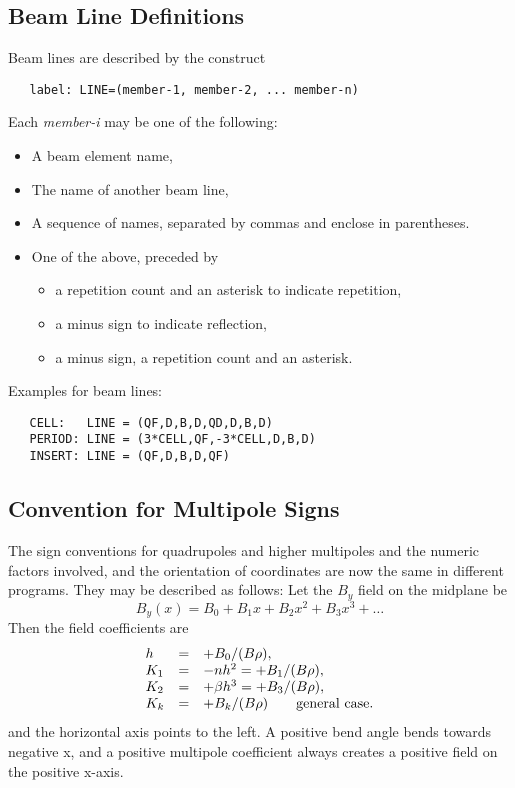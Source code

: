 \documentclass{article}
\begin{document}
\subsection{Beam Line Definitions}
Beam lines are described by the construct
\begin{verbatim}
   label: LINE=(member-1, member-2, ... member-n)
\end{verbatim}
Each {\em member-i} may be one of the following:
\begin{itemize}
\item
  A beam element name,
\item
  The name of another beam line,
\item
  A sequence of names, separated by commas and enclose in parentheses.
\item
  One of the above, preceded by
  \begin{itemize}
  \item
    a repetition count and an asterisk to indicate repetition,
  \item
    a minus sign to indicate reflection,
  \item
    a minus sign, a repetition count and an asterisk.
  \end{itemize}
\end{itemize}
Examples for beam lines:
\begin{verbatim}
   CELL:   LINE = (QF,D,B,D,QD,D,B,D)
   PERIOD: LINE = (3*CELL,QF,-3*CELL,D,B,D)
   INSERT: LINE = (QF,D,B,D,QF)
\end{verbatim}

\subsection{Convention for Multipole Signs}
The sign conventions for quadrupoles and higher multipoles and the
numeric factors involved, and the orientation of coordinates are now
the same in different programs.
They may be described as follows:
Let the $B_y$ field on the midplane be
\[
B_y(x) = B_0 + B_1 x + B_2 x^2 + B_3 x^3 + \ldots
\]
Then the field coefficients are
\[\begin{array}{lcl}
  h &=& + B_0/(B\rho), \\
  K_1 &=& -nh^2 = + B_1 / (B\rho), \\
  K_2 &=& +\beta h^3 = + B_3 / (B\rho), \\
  K_k &=& + B_k / (B\rho) \qquad \hbox{general case.}
\end{array}\]
and the horizontal axis points to the left.
A positive bend angle bends towards negative x,
and a positive multipole coefficient always creates a positive field
on the positive x-axis.
\clearpage
\end{document}
